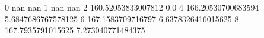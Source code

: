 0 nan nan
1 nan nan
2 160.52053833007812 0.0
4 166.20530700683594 5.6847686767578125
6 167.1583709716797 6.6378326416015625
8 167.7935791015625 7.273040771484375
